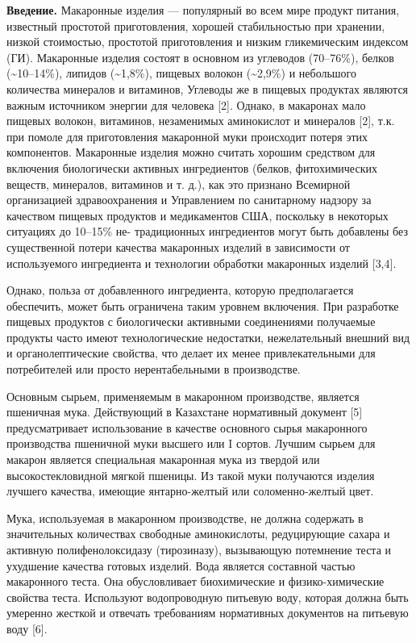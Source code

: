 \begin{multicols}{2}

{\bfseries Введение.} Макаронные изделия --- популярный во всем мире
продукт питания, известный простотой приготовления, хорошей
стабильностью при хранении, низкой стоимостью, простотой приготовления и
низким гликемическим индексом (ГИ). Макаронные изделия состоят в
основном из углеводов (70--76\%), белков (\textasciitilde10--14\%),
липидов (\textasciitilde1,8\%), пищевых волокон (\textasciitilde2,9\%) и
небольшого количества минералов и витаминов, Углеводы же в пищевых
продуктах являются важным источником энергии для человека {[}2{]}.
Однако, в макаронах мало пищевых волокон, витаминов, незаменимых
аминокислот и минералов {[}2{]}, т.к. при помоле для приготовления
макаронной муки происходит потеря этих компонентов. Макаронные изделия
можно считать хорошим средством для включения биологически активных
ингредиентов (белков, фитохимических веществ, минералов, витаминов и т.
д.), как это признано Всемирной организацией здравоохранения и
Управлением по санитарному надзору за качеством пищевых продуктов и
медикаментов США, поскольку в некоторых ситуациях до 10--15\% не-
традиционных ингредиентов могут быть добавлены без существенной потери
качества макаронных изделий в зависимости от используемого ингредиента и
технологии обработки макаронных изделий {[}3,4{]}.

Однако, польза от добавленного ингредиента, которую предполагается
обеспечить, может быть ограничена таким уровнем включения. При
разработке пищевых продуктов с биологически активными соединениями
получаемые продукты часто имеют технологические недостатки,
нежелательный внешний вид и органолептические свойства, что делает их
менее привлекательными для потребителей или просто нерентабельными в
производстве.

Основным сырьем, применяемым в макаронном производстве, является
пшеничная мука. Действующий в Казахстане нормативный документ {[}5{]}
предусматривает использование в качестве основного сырья макаронного
производства пшеничной муки высшего или I сортов. Лучшим сырьем для
макарон является специальная макаронная мука из твердой или
высокостекловидной мягкой пшеницы. Из такой муки получаются изделия
лучшего качества, имеющие янтарно-желтый или соломенно-желтый цвет.

Мука, используемая в макаронном производстве, не должна содержать в
значительных количествах свободные аминокислоты, редуцирующие сахара и
активную полифенолоксидазу (тирозиназу), вызывающую потемнение теста и
ухудшение качества готовых изделий. Вода является составной частью
макаронного теста. Она обусловливает биохимические и физико-химические
свойства теста. Используют водопроводную питьевую воду, которая должна
быть умеренно жесткой и отвечать требованиям нормативных документов на
питьевую воду {[}6{]}.


\end{multicols}
